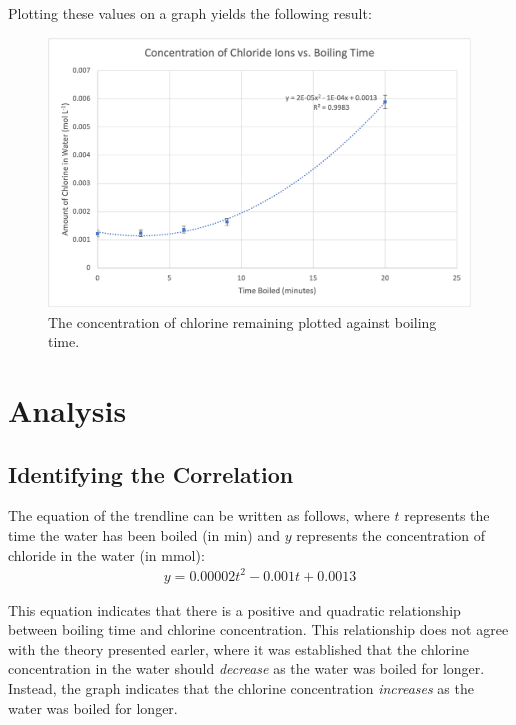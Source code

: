 \documentclass[11pt]{article}
\begin{document}
\newpage

Plotting these values on a graph yields the following result:

\begin{figure}[H]
	\centering
	\caption{The concentration of chlorine remaining plotted against boiling time.}
	\includegraphics[width=\linewidth]{assets/concentration-vs-boiling-time.png}
\end{figure}

\section{Analysis}

\subsection{Identifying the Correlation}

The equation of the trendline can be written as follows, where $t$ represents the time the water has been boiled (in \si{\minute}) and $y$ represents the concentration of chloride in the water (in \si{\mmol}):
%
\begin{align*}
	y = 0.00002t^2 - 0.001t + 0.0013
\end{align*}

This equation indicates that there is a positive and quadratic relationship between boiling time and chlorine concentration. This relationship does not agree with the theory presented earler, where it was established that the chlorine concentration in the water should \textit{decrease} as the water was boiled for longer. Instead, the graph indicates that the chlorine concentration \textit{increases} as the water was boiled for longer.
\end{document}
